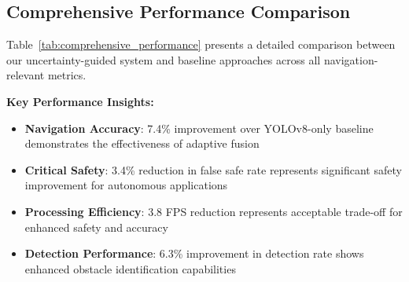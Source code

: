 \documentclass[12pt,oneside]{book}
\newcommand{\tabref}[1]{Table~\ref{#1}}
\begin{document}
\subsection{Comprehensive Performance Comparison}

\tabref{tab:comprehensive_performance} presents a detailed comparison between our uncertainty-guided system and baseline approaches across all navigation-relevant metrics.

\begin{table}[ht]
\centering
\caption{Comprehensive Performance Comparison: Uncertainty-Guided System vs Baselines}
\label{tab:comprehensive_performance}
\end{table}

\textbf{Key Performance Insights:}

\begin{itemize}
\item \textbf{Navigation Accuracy}: 7.4\% improvement over YOLOv8-only baseline demonstrates the effectiveness of adaptive fusion
\item \textbf{Critical Safety}: 3.4\% reduction in false safe rate represents significant safety improvement for autonomous applications
\item \textbf{Processing Efficiency}: 3.8 FPS reduction represents acceptable trade-off for enhanced safety and accuracy
\item \textbf{Detection Performance}: 6.3\% improvement in detection rate shows enhanced obstacle identification capabilities
\end{itemize}
\end{document}
